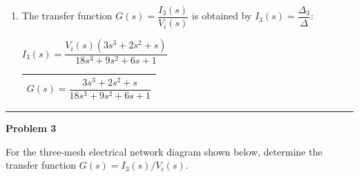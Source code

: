 \documentclass[11pt]{article}
\begin{document}
\begin{enumerate}[label=(\alph*), itemindent=*, leftmargin=*, nolistsep]
	Next, we find the numerator determinant $\Delta_3$ for $I_3(s)$:
	\begin{center}
		$\Delta_3 = \begin{vmatrix} (3s^2 + s + 1) & -1 & 0 \\ -1 & 3 & sV_i \\ -s & -1 & 0 \end{vmatrix}$ \\
		\vspace{10pt}
		Expanding along the third column: \\
		$\Delta_3 = -(sV_i) \begin{vmatrix} (3s^2 + s + 1) & -1 \\ -s & -1 \end{vmatrix}$ \\
		\vspace{10pt}
		$\Delta_3 = -(sV_i) [-(3s^2 + s + 1) - s] = sV_i(3s^2 + 2s + 1)$
	\end{center}

	\item The transfer function $G(s) = \dfrac{I_3(s)}{V_i(s)}$ is obtained by $I_3(s) = \dfrac{\Delta_3}{\Delta}$:
	\begin{center}
		$I_3(s) = \dfrac{V_i(s)(3s^3 + 2s^2 + s)}{18s^3 + 9s^2 + 6s + 1}$ \\
		\vspace{20pt}
		\begin{tabular}{|c|}
			\hline 
			$G(s) = \dfrac{3s^3 + 2s^2 + s}{18s^3 + 9s^2 + 6s + 1}$ \\ [12pt]
			\hline
		\end{tabular}
	\end{center}
\end{enumerate}


\newpage
  \setcounter{page}{5}
\noindent\rule{\textwidth}{1pt}
\noindent\textbf{Problem 3} \hfill 

\noindent For the three-mesh electrical network diagram shown below, determine the transfer function $G(s) = I_3(s)/V_i(s)$.
\end{document}
